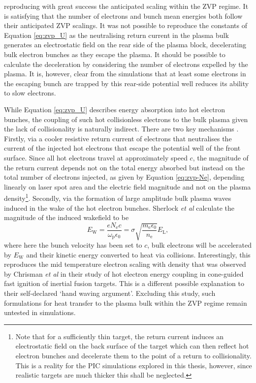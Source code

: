 reproducing with great success the anticipated scaling within the ZVP regime. It is satisfying that the number of electrons and bunch mean energies both follow their anticipated ZVP scalings. It was not possible to reproduce the constants of Equation \ref{eq:zvp_U} as the neutralising return current in the plasma bulk generates an electrostatic field on the rear side of the plasma block, decelerating bulk electron bunches as they escape the plasma. It should be possible to calculate the deceleration by considering the number of electrons expelled by the plasma. It is, however, clear from the simulations that at least some electrons in the escaping bunch are trapped by this rear-side potential well reduces its ability to slow electrons.

While Equation \ref{eq:zvp_U} describes energy absorption into hot electron bunches, the coupling of such hot collisionless electrons to the bulk plasma given the lack of collisionality is naturally indirect. There are two key mechanisms \cite{sherlockIndepthPlasmawaveHeating2014}. Firstly, via a cooler resistive return current of electrons that neutralises the current of the injected hot electrons that escape the potential well of the front surface. Since all hot electrons travel at approximately speed $c$, the magnitude of the return current depends not on the total energy absorbed but instead on the total number of electrons injected, as given by Equation \ref{eq:zvp-Ne}, depending linearly on laser spot area and the electric field magnitude and not on the plasma density\footnote{Note that for a sufficiently thin target, the return current induces an electrostatic field on the back surface of the target which can then reflect hot electron bunches and decelerate them to the point of a return to collisionality. This is a reality for the PIC simulations explored in this thesis, however, since realistic targets are much thicker this shall be neglected.}. Secondly, via the formation of large amplitude bulk plasma waves induced in the wake of the hot electron bunches. Sherlock \textit{et al} \cite{sherlockIndepthPlasmawaveHeating2014} calculate the magnitude of the induced wakefield to be
\begin{equation}
	E_\mathrm{W} = \frac{eN_\mathrm{e}c}{\omega_\mathrm{p}\epsilon_0} = \sigma \sqrt{\frac{m_\mathrm{e}\epsilon_0}{n_\mathrm{e}}}E_\mathrm{L},
\end{equation}where here the bunch velocity has been set to $c$, bulk electrons will be accelerated by $E_\mathrm{W}$ and their kinetic energy converted to heat via collisions. Interestingly, this reproduces the mid temperature electron scaling with density that was observed by Chrisman \textit{et al} \cite{chrismanIntensityScalingHot2008} in their study of hot electron energy coupling in cone-guided fast ignition of inertial fusion targets. This is a different possible explanation to their self-declared `hand waving argument'. Excluding this study, such formulations for heat transfer to the plasma bulk within the ZVP regime remain untested in simulations.


